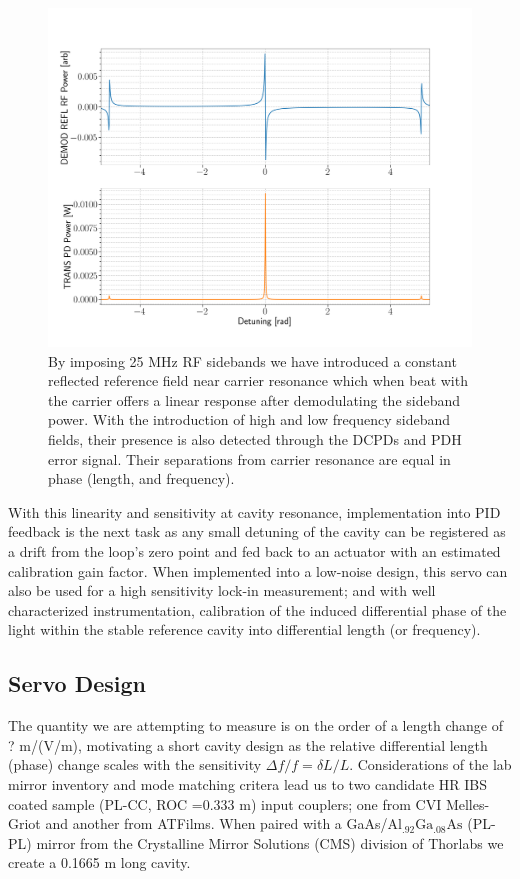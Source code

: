 \begin{figure}[H]
\includegraphics[width=\textwidth]{figs/ALGAAS/pdh_error.png}
\caption{By imposing 25 MHz RF sidebands we have introduced a constant reflected reference field near carrier resonance which when beat with the carrier offers a linear response after demodulating the sideband power. With the introduction of high and low frequency sideband fields, their presence is also detected through the DCPDs and PDH error signal. Their separations from carrier resonance are equal in phase (length, and frequency).}
\label{fig:pdh_error}
\end{figure}

With this linearity and sensitivity at cavity resonance, implementation into PID feedback is the next task as any small detuning of the cavity can be registered as a drift from the loop's zero point and fed back to an actuator with an estimated calibration gain factor. When implemented into a low-noise design, this servo can also be used for a high sensitivity lock-in measurement; and with well characterized instrumentation, calibration of the induced differential phase of the light within the stable reference cavity into differential length (or frequency).


\subsection{Servo Design}
The quantity we are attempting to measure is on the order of a length change of ? m/(V/m), motivating a short cavity design as the relative differential length (phase) change scales with the sensitivity $\Delta f / f = \delta L / L$. Considerations of the lab mirror inventory and mode matching critera lead us to two candidate HR IBS coated sample (PL-CC, ROC =0.333 m) input couplers; one from CVI Melles-Griot and another from ATFilms. When paired with a GaAs/$\mathrm{Al_{.92}Ga_{.08}As}$ (PL-PL) mirror from the Crystalline Mirror Solutions (CMS) division of Thorlabs we create a 0.1665 m long cavity.


